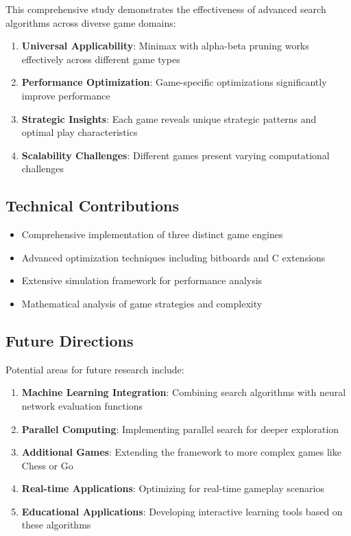 \documentclass[12pt]{article}
\begin{document}
This comprehensive study demonstrates the effectiveness of advanced search algorithms across diverse game domains:

\begin{enumerate}
    \item \textbf{Universal Applicability}: Minimax with alpha-beta pruning works effectively across different game types
    \item \textbf{Performance Optimization}: Game-specific optimizations significantly improve performance
    \item \textbf{Strategic Insights}: Each game reveals unique strategic patterns and optimal play characteristics
    \item \textbf{Scalability Challenges}: Different games present varying computational challenges
\end{enumerate}

\subsection{Technical Contributions}

\begin{itemize}
    \item Comprehensive implementation of three distinct game engines
    \item Advanced optimization techniques including bitboards and C extensions
    \item Extensive simulation framework for performance analysis
    \item Mathematical analysis of game strategies and complexity
\end{itemize}

\subsection{Future Directions}

Potential areas for future research include:

\begin{enumerate}
    \item \textbf{Machine Learning Integration}: Combining search algorithms with neural network evaluation functions
    \item \textbf{Parallel Computing}: Implementing parallel search for deeper exploration
    \item \textbf{Additional Games}: Extending the framework to more complex games like Chess or Go
    \item \textbf{Real-time Applications}: Optimizing for real-time gameplay scenarios
    \item \textbf{Educational Applications}: Developing interactive learning tools based on these algorithms
\end{enumerate}
\end{document}
